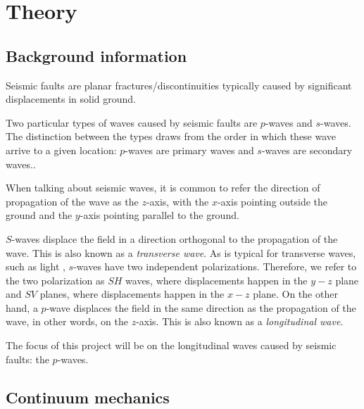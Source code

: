 \chapter{Theory}
\section{Background information}
Seismic faults are planar fractures/discontinuities typically caused by significant displacements in solid ground.

Two particular types of waves caused by seismic faults are $p$-waves and $s$-waves. The distinction between the types draws from the order in which these wave arrive to a given location: $p$-waves are primary waves and $s$-waves are secondary waves.\cite[57]{stein2009introduction}.

When talking about seismic waves, it is common to refer the direction of propagation of the wave as the $z$-axis, with the $x$-axis pointing outside the ground and the $y$-axis pointing parallel to the ground.

$S$-waves displace the field in a direction orthogonal to the propagation of the wave. This is also known as a \textit{transverse wave}. As is typical for transverse waves, such as light \cite[57]{stein2009introduction}, $s$-waves have two independent polarizations. Therefore, we refer to the two polarization as $SH$ waves, where displacements happen in the $y-z$ plane and $SV$ planes, where displacements happen in the $x-z$ plane. 
On the other hand, a $p$-wave displaces the field in the same direction as the propagation of the wave, in other words, on the $z$-axis. This is also known as a \textit{longitudinal wave}\cite[57]{stein2009introduction}.

The focus of this project will be on the longitudinal waves caused by seismic faults: the $p$-waves.




\section{Continuum mechanics}
